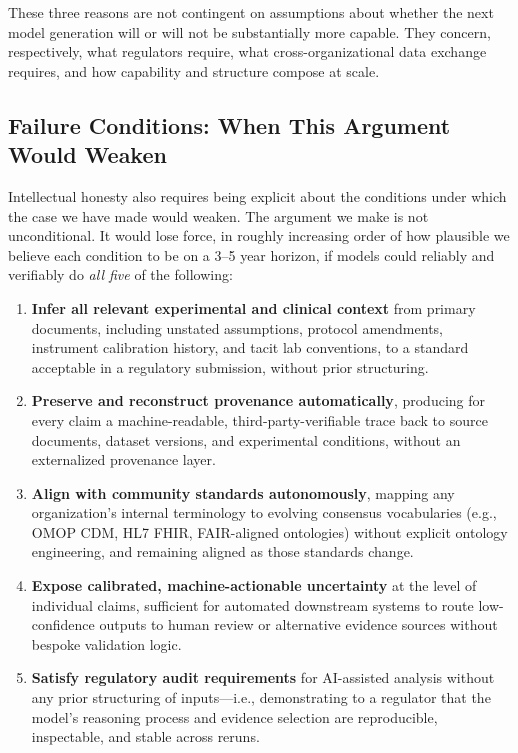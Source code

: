 \documentclass[man,12pt,donotrepeattitle]{apa7}
\begin{document}
These three reasons are not contingent on assumptions about whether the next
model generation will or will not be substantially more capable. They
concern, respectively, what regulators require, what cross-organizational
data exchange requires, and how capability and structure compose at scale.

\subsection{Failure Conditions: When This Argument Would Weaken}

Intellectual honesty also requires being explicit about the conditions under
which the case we have made would weaken. The argument we make is not
unconditional. It would lose force, in roughly increasing order of how
plausible we believe each condition to be on a 3--5 year horizon, if models
could reliably and verifiably do \textit{all five} of the following:

\begin{enumerate}
  \item \textbf{Infer all relevant experimental and clinical context} from
  primary documents, including unstated assumptions, protocol amendments,
  instrument calibration history, and tacit lab conventions, to a standard
  acceptable in a regulatory submission, without prior structuring.

  \item \textbf{Preserve and reconstruct provenance automatically},
  producing for every claim a machine-readable, third-party-verifiable trace
  back to source documents, dataset versions, and experimental conditions,
  without an externalized provenance layer.

  \item \textbf{Align with community standards autonomously}, mapping any
  organization's internal terminology to evolving consensus vocabularies
  (e.g., OMOP CDM, HL7 FHIR, FAIR-aligned ontologies) without explicit
  ontology engineering, and remaining aligned as those standards change.

  \item \textbf{Expose calibrated, machine-actionable uncertainty} at the
  level of individual claims, sufficient for automated downstream systems to
  route low-confidence outputs to human review or alternative evidence
  sources without bespoke validation logic.

  \item \textbf{Satisfy regulatory audit requirements} for AI-assisted
  analysis without any prior structuring of inputs---i.e., demonstrating to
  a regulator that the model's reasoning process and evidence selection are
  reproducible, inspectable, and stable across reruns.
\end{enumerate}
\end{document}
